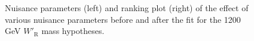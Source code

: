 \begin{figure}[H]
  \centering
  \caption{Nuisance parameters (left) and ranking plot (right) of the effect of various nuisance parameters before and after the fit for the 1200 GeV $W'_{\text{R}}$ mass hypotheses.}
  \label{fig:NuisParAndRanking_WpRH1200}
\end{figure}
